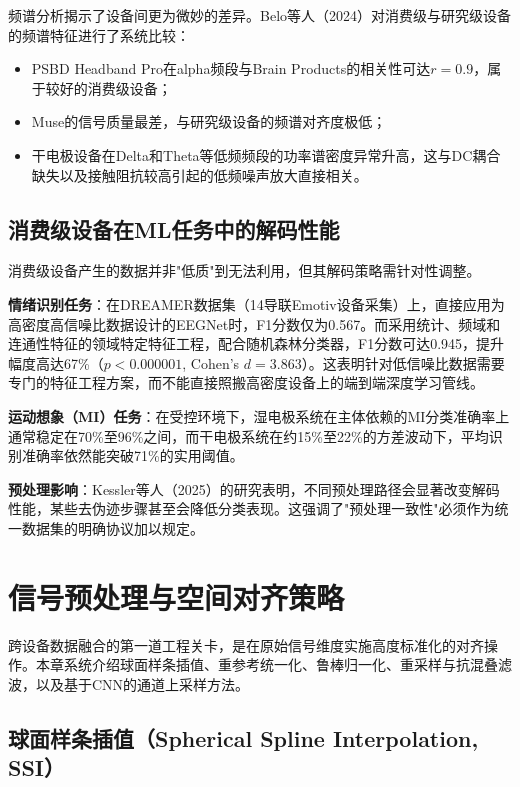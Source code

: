 \documentclass[12pt, a4paper]{article}
\begin{document}
频谱分析揭示了设备间更为微妙的差异。Belo等人（2024）对消费级与研究级设备的频谱特征进行了系统比较\citep{Sensors2024spectral}：

\begin{itemize}
  \item PSBD Headband Pro在alpha频段与Brain Products的相关性可达$r=0.9$，属于较好的消费级设备；
  \item Muse的信号质量最差，与研究级设备的频谱对齐度极低；
  \item 干电极设备在Delta和Theta等低频频段的功率谱密度异常升高，这与DC耦合缺失以及接触阻抗较高引起的低频噪声放大直接相关。
\end{itemize}

\subsection{消费级设备在ML任务中的解码性能}

消费级设备产生的数据并非"低质"到无法利用，但其解码策略需针对性调整。

\textbf{情绪识别任务}：在DREAMER数据集（14导联Emotiv设备采集）上，直接应用为高密度高信噪比数据设计的EEGNet时，F1分数仅为0.567。而采用统计、频域和连通性特征的领域特定特征工程，配合随机森林分类器，F1分数可达0.945，提升幅度高达67\%（$p<0.000001$, Cohen's $d=3.863$）\citep{EmotionCrossDataset2025}。这表明针对低信噪比数据需要专门的特征工程方案，而不能直接照搬高密度设备上的端到端深度学习管线。

\textbf{运动想象（MI）任务}：在受控环境下，湿电极系统在主体依赖的MI分类准确率上通常稳定在70\%至96\%之间，而干电极系统在约15\%至22\%的方差波动下，平均识别准确率依然能突破71\%的实用阈值\citep{dryEEGmotorimagery2025}。

\textbf{预处理影响}：Kessler等人（2025）的研究表明，不同预处理路径会显著改变解码性能，某些去伪迹步骤甚至会降低分类表现\citep{Kessler2025preprocessing}。这强调了"预处理一致性"必须作为统一数据集的明确协议加以规定。

\section{信号预处理与空间对齐策略}
\label{sec:preprocessing}

跨设备数据融合的第一道工程关卡，是在原始信号维度实施高度标准化的对齐操作。本章系统介绍球面样条插值、重参考统一化、鲁棒归一化、重采样与抗混叠滤波，以及基于CNN的通道上采样方法。

\subsection{球面样条插值（Spherical Spline Interpolation, SSI）}
\end{document}
